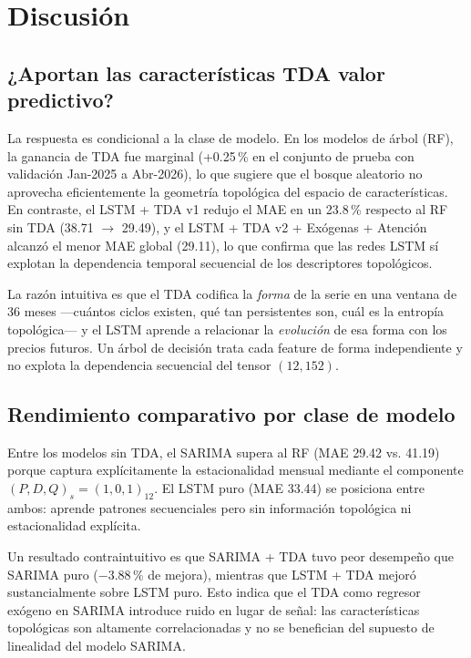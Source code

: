 \documentclass[12pt, a4paper]{article}
\begin{document}
\section{Discusión}

\subsection{¿Aportan las características TDA valor predictivo?}

La respuesta es condicional a la clase de modelo. En los modelos de árbol (RF), la ganancia de
TDA fue marginal (+0.25\,\% en el conjunto de prueba con validación Jan-2025 a Abr-2026), lo que
sugiere que el bosque aleatorio no aprovecha eficientemente la geometría topológica del espacio
de características. En contraste, el LSTM + TDA v1 redujo el MAE en un 23.8\,\% respecto al RF
sin TDA (38.71 $\to$ 29.49), y el LSTM + TDA v2 + Exógenas + Atención alcanzó el menor MAE
global (29.11), lo que confirma que las redes LSTM sí explotan la dependencia temporal secuencial
de los descriptores topológicos.

La razón intuitiva es que el TDA codifica la \textit{forma} de la serie en una ventana de 36 meses
—cuántos ciclos existen, qué tan persistentes son, cuál es la entropía topológica— y el LSTM
aprende a relacionar la \textit{evolución} de esa forma con los precios futuros. Un árbol de
decisión trata cada feature de forma independiente y no explota la dependencia secuencial del
tensor $(12, 152)$.

\subsection{Rendimiento comparativo por clase de modelo}

Entre los modelos sin TDA, el SARIMA supera al RF (MAE 29.42 vs. 41.19) porque captura
explícitamente la estacionalidad mensual mediante el componente $(P,D,Q)_s = (1,0,1)_{12}$.
El LSTM puro (MAE 33.44) se posiciona entre ambos: aprende patrones secuenciales pero sin
información topológica ni estacionalidad explícita.

Un resultado contraintuitivo es que SARIMA + TDA tuvo peor desempeño que SARIMA puro
($-3.88\,\%$ de mejora), mientras que LSTM + TDA mejoró sustancialmente sobre LSTM puro. Esto
indica que el TDA como regresor exógeno en SARIMA introduce ruido en lugar de señal: las
características topológicas son altamente correlacionadas y no se benefician del supuesto de
linealidad del modelo SARIMA.
\end{document}
